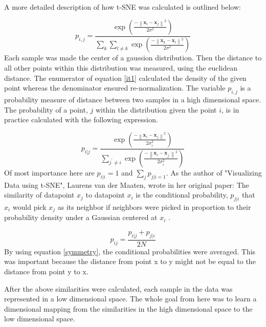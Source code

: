 \documentclass[11pt, fleqn, titlepage]{article}
\newcommand{\norm}[1]{\left\lVert#1\right\rVert}
\newcommand{\1}[1]{\mathds{1}\left[#1\right]}
\begin{document}
A more detailed description of how t-SNE was calculated is outlined below:

\begin{equation}\label{it1}
		p_{i,j} = \frac{\exp(\frac{-\norm{\mathbf x_i - \mathbf x_j}^2}{2 \sigma^2})}{\sum_{k} \sum_{l \neq k} \exp (\frac{-\norm{\mathbf x_k - \mathbf x_l}^2}{2 \sigma^2})}
\end{equation}
Each sample was made the center of a gaussion distribution. Then the distance to all other points within this distribution was measured, using the euclidean distance. The enumerator of equation \eqref{it1} calculated the density of the given point whereas the denominator ensured re-normalization. The variable $ p_{i,j} $ is a probability measure of distance between two samples in a high dimensional space. The probability of a point, $ j $ within the distribution given the point $ i $, is in practice calculated with the following expression.

\begin{equation*}\label{key}
	p_{i \vert j} = \frac{\exp(\frac{-\norm{\mathbf x_i - \mathbf x_j}^2}{2 \sigma_i^2})}{\sum_{j^\prime \neq i} \exp (\frac{-\norm{\mathbf x_i - \mathbf x_{j^\prime}}^2}{2 \sigma_i^2})}
\end{equation*}
\noindent
Of most importance here are $ p_{i \vert i} = 1$  and $ \sum_{j} p_{j \vert i = 1}$. As the author of "Visualizing Data using t-SNE", Laurens van der Maaten,  wrote in her original paper: The similarity of datapoint $ x_j $ to datapoint $ x_i $ is the conditional probability, $ p_{j \vert i} $  that $ x_i $ would pick $ x_j $ as its neighbor if neighbors were picked in proportion to their probability density under a Gaussian centered at $  x_i $ \cite{tsne}.

\begin{equation}\label{symmetry}
	p_{ij} = \frac{	p_{i \vert j} + p_{j \vert i}}{2N}
\end{equation}
\noindent
By using equation \eqref{symmetry}, the conditional probabilities were averaged. This was important because the distance from point x to y might not be equal to the distance from point y to x. 

After the above similarities were calculated, each sample in the data was represented in a low dimensional space. The whole goal from here was to learn a dimensional mapping from the similarities in the high dimensional space to the low dimensional space.
\end{document}
